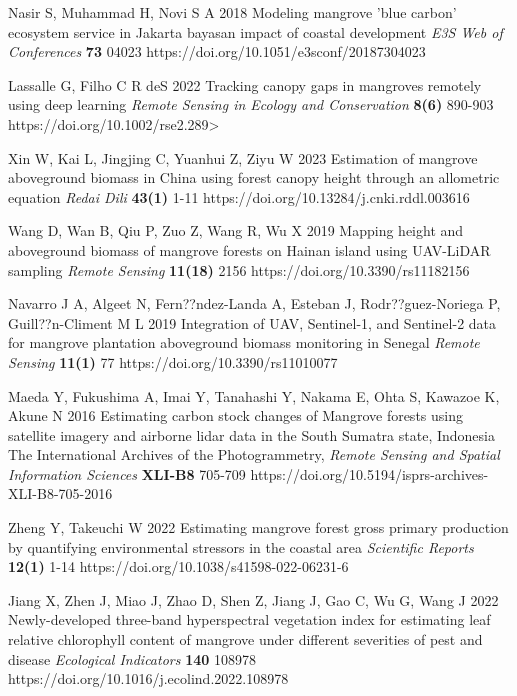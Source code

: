 \documentclass[a4paper]{jpconf}
\begin{document}
\begin{thebibliography}{9}
 Nasir S, Muhammad H, Novi S A 2018 Modeling mangrove 'blue carbon' ecosystem service in Jakarta bayasan impact of coastal development \emph{E3S Web of Conferences} \textbf{73} 04023 https://doi.org/10.1051/e3sconf/20187304023

 Lassalle G, Filho C R deS 2022 Tracking canopy gaps in mangroves remotely using deep learning \emph{Remote Sensing in Ecology and Conservation} \textbf{8(6)} 890-903 https://doi.org/10.1002/rse2.289>

 Xin W, Kai L, Jingjing C, Yuanhui Z, Ziyu W 2023 Estimation of mangrove aboveground biomass in China using forest canopy height through an allometric equation \emph{Redai Dili} \textbf{43(1)} 1-11 https://doi.org/10.13284/j.cnki.rddl.003616

 Wang D, Wan B, Qiu P, Zuo Z, Wang R, Wu X 2019 Mapping height and aboveground biomass of mangrove forests on Hainan island using UAV-LiDAR sampling \emph{Remote Sensing} \textbf{11(18)} 2156 https://doi.org/10.3390/rs11182156

 Navarro J A, Algeet N, Fern??ndez-Landa A, Esteban J, Rodr??guez-Noriega P, Guill??n-Climent M L 2019 Integration of UAV, Sentinel-1, and Sentinel-2 data for mangrove plantation aboveground biomass monitoring in Senegal \emph{Remote Sensing} \textbf{11(1)} 77 https://doi.org/10.3390/rs11010077

 Maeda Y, Fukushima A, Imai Y, Tanahashi Y, Nakama E, Ohta S, Kawazoe K, Akune N 2016 Estimating  carbon stock changes of Mangrove forests using satellite imagery and airborne lidar data in the South Sumatra state,
Indonesia The International Archives of the Photogrammetry, \emph{Remote Sensing and Spatial Information Sciences} \textbf{XLI-B8} 705-709 https://doi.org/10.5194/isprs-archives-XLI-B8-705-2016

 Zheng Y, Takeuchi W 2022 Estimating mangrove forest gross primary production by quantifying environmental stressors in the coastal area \emph{Scientific Reports} \textbf{12(1)} 1-14 https://doi.org/10.1038/s41598-022-06231-6

 Jiang X, Zhen J, Miao J, Zhao D, Shen Z, Jiang J, Gao C, Wu G, Wang J 2022 Newly-developed three-band hyperspectral vegetation index for estimating leaf relative chlorophyll content of mangrove under different severities of pest and disease \emph{Ecological Indicators} \textbf{140} 108978 https://doi.org/10.1016/j.ecolind.2022.108978


\end{thebibliography}
\end{document}
